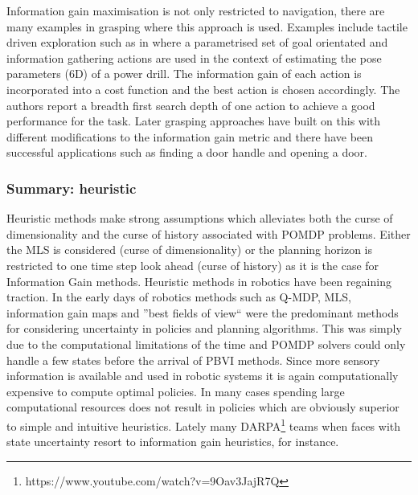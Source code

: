Information gain maximisation is not only restricted to navigation, there are many examples in grasping where this approach is used. 
Examples include tactile driven exploration such as in \cite{Hsiao_RSS_10} where a parametrised set of goal orientated and information gathering actions are used in the context of estimating the pose parameters (6D) of a power drill. 
The information gain of each action is incorporated into a cost function and the best action is chosen accordingly. The authors report a breadth first search depth of one action to achieve a good performance for the task.
Later grasping approaches have built on this with different modifications to the information gain metric \cite{Efficient_touch_2012} and there have 
been successful applications such as finding a door handle \cite{next_best_touch} and opening a door.

\subsubsection{Summary: heuristic}

Heuristic methods make strong assumptions which alleviates both the curse of dimensionality and the curse of history associated with POMDP problems. 
Either the MLS is considered (curse of dimensionality) or the planning horizon is restricted to one time step look ahead (curse of history) as it is the case 
for Information Gain methods. Heuristic methods in robotics have been regaining traction. In the early days of robotics methods such as Q-MDP, MLS, 
information gain maps and ''best fields of view`` were the predominant methods for considering uncertainty in policies and planning algorithms. This was simply 
due to the computational limitations of the time and POMDP solvers could only handle a few states before the arrival of PBVI methods.  Since more 
sensory information is available and used in robotic systems it is again computationally expensive to compute optimal policies. In many cases 
spending large computational resources does not result in policies which are obviously superior to simple and intuitive heuristics. Lately many 
DARPA\footnote{https://www.youtube.com/watch?v=9Oav3JajR7Q} teams when faces with state uncertainty resort to information gain heuristics, for instance. 




